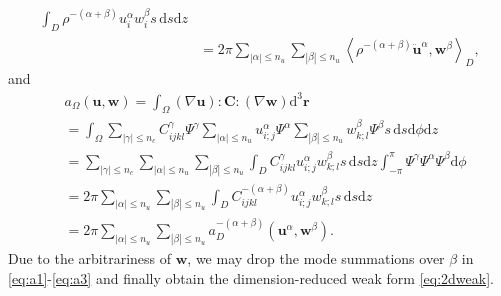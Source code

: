 \documentclass[extra,referee]{gji}
\begin{document}
\begin{appendices}
\begin{equation}
\begin{alignedat}{1}
    \int_{D} \rho^{-\left(\alpha+\beta\right)} u_i^{\alpha} w_i^\beta s\,\text{d}s\text{d}z \\&=
    2\pi \sum_{|\alpha|\le n_u} \sum_{|\beta|\le n_u} 
    \left\langle \rho^{-\left(\alpha+\beta\right)} \ddot{\mathbf{u}}^{\alpha},
    \mathbf{w}^{\beta}\right\rangle_{D},
  \end{alignedat}
  \label{eq:a2}
\end{equation}
and
\begin{equation}
  \begin{alignedat}{1}
    & a_{\Omega}\left(\mathbf{u},\mathbf{w}\right)  =
    \int_{\Omega} \left(\nabla\mathbf{u}\right) :\mathbf{C}: \left(\nabla\mathbf{w}\right)
    \text{d}^{3}\mathbf{r} \\&=
    \int_{\Omega} \sum_{|\gamma|\le n_c} C^\gamma_{ijkl} \Psi^\gamma
    \sum_{|\alpha|\le n_u} u_{i;j}^\alpha \Psi^\alpha
    \sum_{|\beta|\le n_u}  w_{k;l}^\beta \Psi^\beta s\,\text{d}s\text{d}\phi \text{d}z \\&=
    \sum_{|\gamma|\le n_c} \sum_{|\alpha|\le n_u} \sum_{|\beta|\le n_u}  
    \int_{D} C^\gamma_{ijkl} u_{i;j}^\alpha w_{k;l}^\beta s\,\text{d}s\text{d}z 
    \int_{-\pi}^{\pi} \Psi^\gamma \Psi^\alpha \Psi^\beta \text{d}\phi\\&=
    2\pi \sum_{|\alpha|\le n_u} \sum_{|\beta|\le n_u} 
    \int_{D} C^{-\left(\alpha+\beta\right)}_{ijkl} u_{i;j}^\alpha w_{k;l}^\beta s\,\text{d}s\text{d}z \\&=
    2\pi \sum_{|\alpha|\le n_u} \sum_{|\beta|\le n_u} 
    a_{D}^{-\left(\alpha+\beta\right)}\left(\mathbf{u}^\alpha,\mathbf{w}^{\beta}\right).
  \end{alignedat}
  \label{eq:a3}
\end{equation}
Due to the arbitrariness of $\mathbf{w}$, we may drop the mode summations 
over $\beta$ in \eqref{eq:a1}-\eqref{eq:a3} and finally obtain
the dimension-reduced weak form \eqref{eq:2dweak}.

\end{appendices}

\bsp %

\newpage
\end{document}
